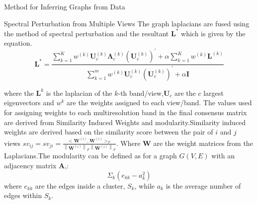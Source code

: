 \documentclass[final]{beamer}
\newlength{\colwidth}
\begin{document}
\begin{frame}[t]
\begin{columns}[t]
\begin{column}{\colwidth}
\begin{block}{Method for Inferring Graphs from Data}
    
  \end{block}
  \begin{block}{Spectral Perturbation from Multiple Views}
  The graph laplacians are fused using the method of spectral perturbation and the resultant $\mathbf{L}^{*}$ which is given by the equation.
\begin{equation}
\mathbf{L}^*=\frac{\sum_{k=1}^K w^{(k)} \mathbf{U}_c^{(k)} \mathbf{\Lambda}_c^{(k)}\left(\mathbf{U}_c^{(k)}\right)^{\prime}+\alpha \sum_{k=1}^K w^{(k)} \mathbf{L}^{(k)}}{\sum_{k=1}^m w^{(k)} \mathbf{U}_c^{(k)}\left(\mathbf{U}_c^{(k)}\right)^{\prime}+\alpha \mathbf{I}}
\end{equation}

where the $\mathbf{L}^{k}$ is the laplacian of the $k$-th band/view,$\mathbf{U}_{c}$ are the $c$ largest eigenvectors and $w^{k}$ are the weights assigned to each view/band.
The values used for assigning weights to each multiresolution band in the final consensus matrix are derived from Similarity Induced Weights and modularity.Similarity induced weights are derived based on the similarity score between the pair of $i$ and $j$ views $sv_{i j}=sv_{j i}=\frac{<\boldsymbol{W}^{(i)}, \boldsymbol{W}^{(i)}>_F}{\left\|\boldsymbol{W}^{(i)}\right\| _F\left\|\boldsymbol{W}^{(i)}\right\|_F}$.
Where $\boldsymbol{W}$ are the weight matrices from the Laplacians.The modularity can be defined as for a graph $G(V,E)$ with an adjacency matrix $\mathbf{A}$,:
\begin{equation}
    \Sigma_{k}(e_{kk}-a_{k}^2)
\end{equation}
where $e_{kk}$ are the edges inside a cluster, $S_{k}$, while $a_{k}$ is the average number of edges within $S_{k}$.



  
      

\end{block}
\end{column}
\end{columns}
\end{frame}
\end{document}

